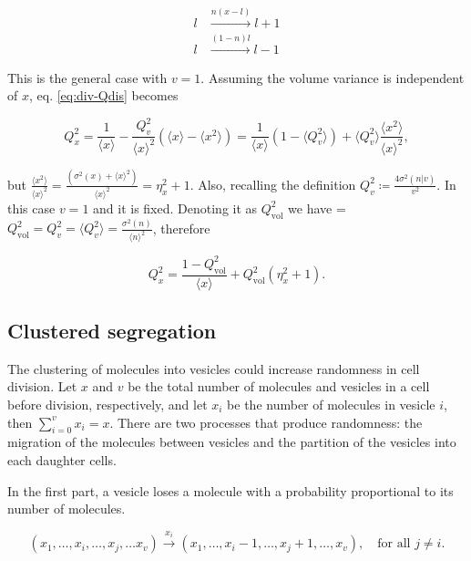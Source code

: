 \begin{equation}
  \begin{split}
    l&\xrightarrow{n(x-l)}l+1\\
    l&\xrightarrow{(1-n)l}l-1
  \end{split}
\end{equation}

This is the general case with $v=1$. Assuming the volume variance is independent of $x$, eq. \eqref{eq:div-Qdis} becomes

\begin{equation}
  Q_x^2 = \frac{1}{\langle x\rangle} - \frac{Q_v^2}{\langle x\rangle^2}\left(\langle x\rangle  - \langle x^2\rangle\right) = \frac{1}{\langle x\rangle}\left(1-\langle Q_v^2\rangle\right) + \langle Q_v^2\rangle\frac{\langle x^2\rangle}{\langle x\rangle^2},
\end{equation}

but $\frac{\langle x^2\rangle}{\langle x\rangle^2} = \frac{(\sigma^2(x) + \langle x\rangle^2)}{\langle x\rangle^2} = \eta_x^2 + 1$. Also, recalling the definition  $Q_v^2 \coloneqq \frac{4\sigma^2(n|v)}{v^2}$. In this case $v=1$ and it is fixed. Denoting it as $Q^2_\text{vol}$ we have = $Q^2_\text{vol} = Q_v^2 = \langle Q_v^2\rangle = \frac{\sigma^2(n)}{\langle n\rangle^2}$, therefore

\begin{equation}
  \boxed{Q_x^2 = \frac{1-Q_\text{vol}^2}{\langle x\rangle} + Q_\text{vol}^2(\eta^2_x+1)}.
\end{equation}

\subsection{Clustered segregation}

The clustering of molecules into vesicles could increase randomness in cell division. Let $x$ and $v$ be the total number of molecules and vesicles in a cell before division, respectively, and let $x_i$ be the number of molecules in vesicle $i$, then $\sum_{i=0}^vx_i=x$. There are two processes that produce randomness: the migration of the molecules between vesicles and the partition of the vesicles into each daughter cells.

In the first part, a vesicle loses a molecule with a probability proportional to its number of molecules.

\begin{equation}
  \label{eq:div-vesicle_switch}
  (x_1,\dotsc,x_i,\dotsc,x_j,\dotsc x_v) \xrightarrow{x_i} (x_1,\dotsc,x_i-1,\dotsc,x_j+1,\dotsc, x_v),\quad \text{for all } j\neq i.
\end{equation}

